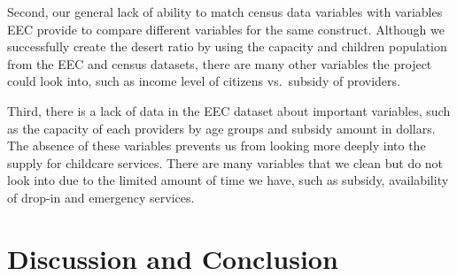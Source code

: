 \documentclass[10pt,letterpaper]{article}
\begin{document}
Second, our general lack of ability to match census data variables with
variables EEC provide to compare different variables for the same
construct. Although we successfully create the desert ratio by using the
capacity and children population from the EEC and census datasets, there
are many other variables the project could look into, such as income
level of citizens vs.~subsidy of providers.

Third, there is a lack of data in the EEC dataset about important
variables, such as the capacity of each providers by age groups and
subsidy amount in dollars. The absence of these variables prevents us
from looking more deeply into the supply for childcare services. There
are many variables that we clean but do not look into due to the limited
amount of time we have, such as subsidy, availability of drop-in and
emergency services.

\section{Discussion and Conclusion}\label{discussion-and-conclusion}
\end{document}
